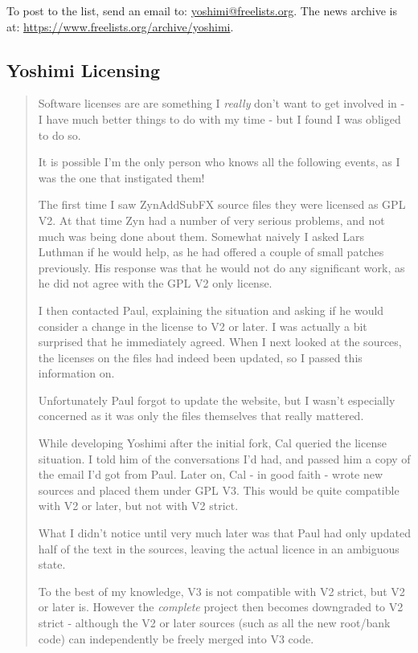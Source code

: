\documentclass[
 11pt,
 twoside,
 a4paper,
 final                                 %
]{article}
\begin{document}
   To post to the list, send an email to: \url{yoshimi@freelists.org}.
   The news archive is at: \url{https://www.freelists.org/archive/yoshimi}.

\subsection{Yoshimi Licensing}
\label{subsec:introduction_yoshimi_licensing}

   \begin{quotation}
      Software licenses are are something I \textsl{really}
      don't want to get involved in - I have much better things to do with my
      time - but I found I was obliged to do so.

      It is possible I'm the only person who knows all the following events, as
      I was the one that instigated them!

      The first time I saw ZynAddSubFX source files they were licensed as GPL
      V2. At that time Zyn had a number of very serious problems, and not much
      was being done about them. Somewhat naively I asked Lars Luthman if he
      would help, as he had offered a couple of small patches previously. His
      response was that he would not do any significant work, as he did not
      agree with the GPL V2 only license.

      I then contacted Paul, explaining the situation and asking if he would
      consider a change in the license to V2 or later. I was actually a bit
      surprised that he immediately agreed. When I next looked at the sources,
      the licenses on the files had indeed been updated, so I passed this
      information on.

      Unfortunately Paul forgot to update the website, but I wasn't especially
      concerned as it was only the files themselves that really mattered.

      While developing Yoshimi after the initial fork, Cal queried the license
      situation. I told him of the conversations I'd had, and passed him a copy
      of the email I'd got from Paul. Later on, Cal - in good faith - wrote new
      sources and placed them under GPL V3. This would be quite compatible with
      V2 or later, but not with V2 strict.

      What I didn't notice until very much later was that Paul had only updated
      half of the text in the sources, leaving the actual licence in an
      ambiguous state.

      To the best of my knowledge, V3 is not compatible with V2 strict, but V2
      or later is. However the \textsl{complete}
      project then becomes downgraded to V2
      strict - although the V2 or later sources (such as all the new root/bank
      code) can independently be freely merged into V3 code.


\end{quotation}
\end{document}
